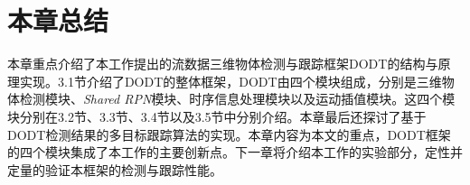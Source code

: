 \section{本章总结}
\label{metho_conclusion}
本章重点介绍了本工作提出的流数据三维物体检测与跟踪框架DODT的结构与原理实现。3.1节介绍了DODT的整体框架，DODT由四个模块组成，分别是三维物体检测模块、\textit{Shared RPN}模块、时序信息处理模块以及运动插值模块。这四个模块分别在3.2节、3.3节、3.4节以及3.5节中分别介绍。本章最后还探讨了基于DODT检测结果的多目标跟踪算法的实现。本章内容为本文的重点，DODT框架的四个模块集成了本工作的主要创新点。下一章将介绍本工作的实验部分，定性并定量的验证本框架的检测与跟踪性能。

\ifprint
\newpage
\thispagestyle{empty}
\mbox{}

\clearpage
\setcounter{page}{10}
\fi